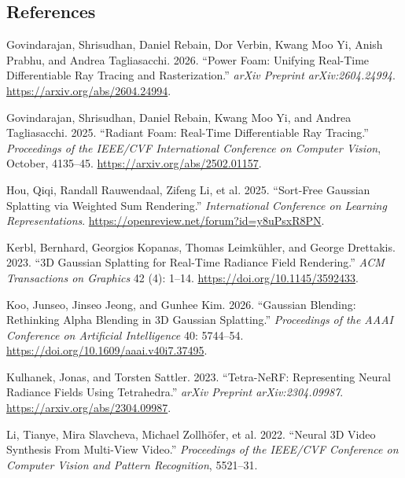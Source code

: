 \documentclass[
]{article}
\newlength{\cslhangindent}
\newenvironment{CSLReferences}[2] %
 {\begin{list}{}{%
  \setlength{\itemindent}{0pt}
  \setlength{\leftmargin}{0pt}
  \setlength{\parsep}{0pt}
  \ifodd #1
   \setlength{\leftmargin}{\cslhangindent}
   \setlength{\itemindent}{-1\cslhangindent}
  \fi
  \setlength{\itemsep}{#2\baselineskip}}}
 {\end{list}}
\begin{document}
\protect{}\label{refs}
\subsection{References}\label{references}

\protect{}\label{refs}
\begin{CSLReferences}{1}{1}
Govindarajan, Shrisudhan, Daniel Rebain, Dor Verbin, Kwang Moo Yi, Anish
Prabhu, and Andrea Tagliasacchi. 2026. {``{Power Foam: Unifying
Real-Time Differentiable Ray Tracing and Rasterization}.''} \emph{arXiv
Preprint arXiv:2604.24994}. \url{https://arxiv.org/abs/2604.24994}.

Govindarajan, Shrisudhan, Daniel Rebain, Kwang Moo Yi, and Andrea
Tagliasacchi. 2025. {``{Radiant Foam: Real-Time Differentiable Ray
Tracing}.''} \emph{Proceedings of the IEEE/CVF International Conference
on Computer Vision}, October, 4135--45.
\url{https://arxiv.org/abs/2502.01157}.

Hou, Qiqi, Randall Rauwendaal, Zifeng Li, et al. 2025. {``{Sort-Free
Gaussian Splatting via Weighted Sum Rendering}.''} \emph{International
Conference on Learning Representations}.
\url{https://openreview.net/forum?id=y8uPsxR8PN}.

Kerbl, Bernhard, Georgios Kopanas, Thomas Leimkühler, and George
Drettakis. 2023. {``{3D Gaussian Splatting for Real-Time Radiance Field
Rendering}.''} \emph{ACM Transactions on Graphics} 42 (4): 1--14.
\url{https://doi.org/10.1145/3592433}.

Koo, Junseo, Jinseo Jeong, and Gunhee Kim. 2026. {``{Gaussian Blending:
Rethinking Alpha Blending in 3D Gaussian Splatting}.''}
\emph{Proceedings of the AAAI Conference on Artificial Intelligence} 40:
5744--54. \url{https://doi.org/10.1609/aaai.v40i7.37495}.

Kulhanek, Jonas, and Torsten Sattler. 2023. {``{Tetra-NeRF: Representing
Neural Radiance Fields Using Tetrahedra}.''} \emph{arXiv Preprint
arXiv:2304.09987}. \url{https://arxiv.org/abs/2304.09987}.

Li, Tianye, Mira Slavcheva, Michael Zollhöfer, et al. 2022. {``{Neural
3D Video Synthesis From Multi-View Video}.''} \emph{Proceedings of the
IEEE/CVF Conference on Computer Vision and Pattern Recognition},
5521--31.


\end{CSLReferences}
\end{document}
